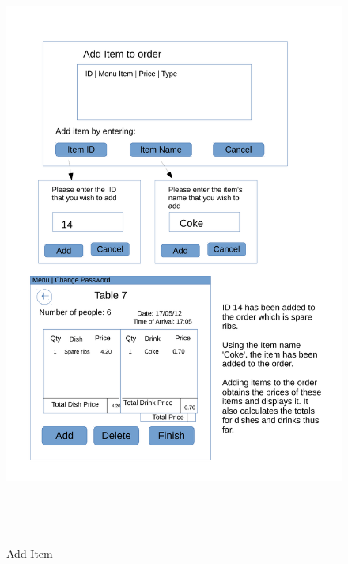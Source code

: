 \begin{figure}[H]
    \includegraphics[height = 20cm]{./Design/Images/Interface33}
    \caption{Add Item} \label{fig:Adding}
\end{figure}

